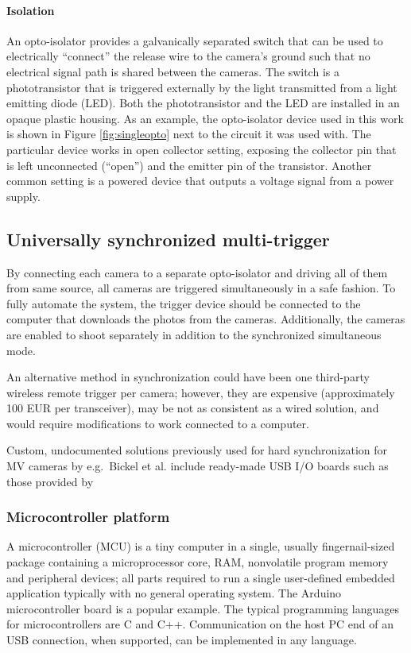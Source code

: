 \paragraph{Isolation}
An opto-isolator provides a galvanically separated switch that can be used to electrically ``connect'' the release wire to the camera's ground such that no electrical signal path is shared between the cameras.
The switch is a phototransistor that is triggered externally by the light transmitted from a light emitting diode (LED).
Both the phototransistor and the LED are installed in an opaque plastic housing.
As an example, the opto-isolator device used in this work is shown in Figure \ref{fig:singleopto} next to the circuit it was used with.
The particular device works in open collector setting, exposing the collector pin that is left unconnected (``open'') and the emitter pin of the transistor.
Another common setting is a powered device that outputs a voltage signal from a power supply.

\subsection{Universally synchronized multi-trigger} %

By connecting each camera to a separate opto-isolator and driving all of them from same source, all cameras are triggered simultaneously in a safe fashion.
To fully automate the system, the trigger device should be connected to the computer that downloads the photos from the cameras.
Additionally, the cameras are enabled to shoot separately in addition to the synchronized simultaneous mode.

An alternative method in synchronization could have been one third-party wireless remote trigger per camera;
however, they are expensive (approximately 100 EUR per transceiver), may be not as consistent as a wired solution, and would require modifications to work connected to a computer.

Custom, undocumented solutions previously used for hard synchronization for MV cameras by e.g.\ Bickel et al. \cite{bickel2007multi} include ready-made USB I/O boards such as those provided by \cite{datatranslation}

\subsubsection{Microcontroller platform}

A microcontroller (MCU) is a tiny computer in a single, usually fingernail-sized package containing a microprocessor core, RAM, nonvolatile program memory and peripheral devices; all parts required to run a single user-defined embedded application typically with no general operating system.
The Arduino microcontroller board is a popular example.
The typical programming languages for microcontrollers are C and C++.
Communication on the host PC end of an USB connection, when supported, can be implemented in any language.

